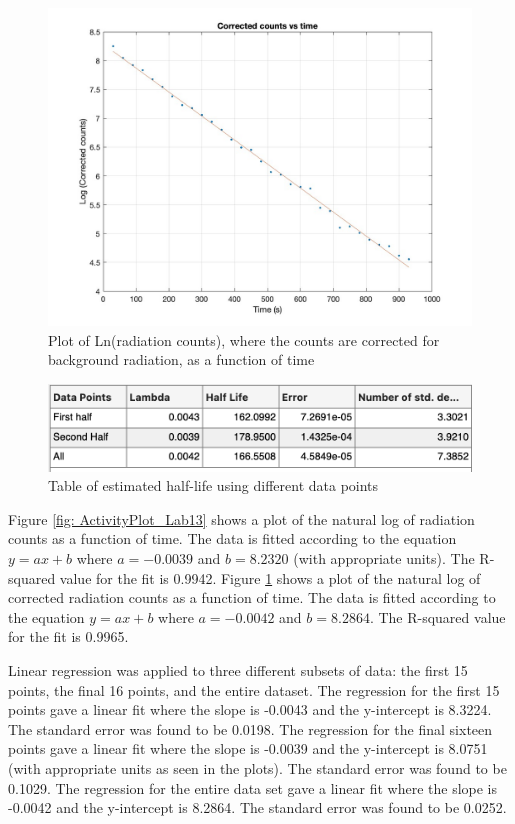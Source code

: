 \documentclass[reprint,amsmath,amssymb,aps,prl]{revtex4-2}
\begin{document}
\begin{figure}
    \centering
    \includegraphics[width = \columnwidth]{Lab13_CorrectedCountsPlot.jpg}
    \caption{Plot of Ln(radiation counts), where the counts are  corrected for background radiation, as a function of time}
    \label{fig: CorrectedCountsPlot_Lab13}
\end{figure}


\begin{figure}
    \centering
    \includegraphics[width = \columnwidth]{Lab13_Table.png}
    \caption{Table of estimated half-life using different data points}
    \label{fig: Lab13_Table}
\end{figure}
Figure \ref{fig: ActivityPlot_Lab13} shows a plot of the natural log of radiation counts as a function of time. The data is fitted according to the equation $y = ax + b$ where $a = -0.0039$ and $b = 8.2320$ (with appropriate units). The R-squared value for the fit is 0.9942. Figure \ref{fig: CorrectedCountsPlot_Lab13} shows a plot of the natural log of corrected radiation counts as a function of time. The data is fitted according to the equation $y = ax + b$ where $a = -0.0042$ and $b = 8.2864$. The R-squared value for the fit is 0.9965.

Linear regression was applied to three different subsets of data: the first 15 points, the final 16 points, and the entire dataset. The regression for the first 15 points gave a linear fit where the slope is -0.0043 and the y-intercept is 8.3224. The standard error was found to be 0.0198. 
The regression for the final sixteen points gave a linear fit where the slope is -0.0039 and the y-intercept is 8.0751 (with appropriate units as seen in the plots). The standard error was found to be 0.1029. The regression for the entire data set gave a linear fit where the slope is -0.0042 and the y-intercept is 8.2864. The standard error was found to be 0.0252. 
\end{document}
